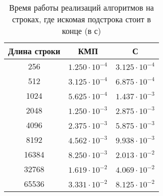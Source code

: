 \begin{table}[H]
	\begin{center}
		\begin{threeparttable}
			\captionsetup{justification=raggedright,singlelinecheck=off}
			\caption{Время работы реализаций алгоритмов на строках, где искомая подстрока стоит в конце (в с)}
			\label{tbl:time_measurements_1}
			\begin{tabular}{|c|c|c|}
				\hline
				Длина строки &  КМП  & С \\
				\hline
				256 &$ 1.250\cdot 10^{-4} $&$ 3.125\cdot 10^{-4}$\\
				\hline
				512 &$ 3.125\cdot 10^{-4} $&$ 6.875\cdot 10^{-4}$\\
				\hline
				1024 &$ 5.625\cdot 10^{-4} $&$ 1.437\cdot 10^{-3}$\\
				\hline
				2048 &$ 1.250\cdot 10^{-3} $&$ 2.875\cdot 10^{-3}$\\
				\hline
				4096 &$ 2.375\cdot 10^{-3} $&$ 5.875\cdot 10^{-3}$\\
				\hline
				8192 &$ 4.562\cdot 10^{-3} $&$ 9.938\cdot 10^{-3}$\\
				\hline
				16384 &$ 8.250\cdot 10^{-3} $&$ 2.013\cdot 10^{-2}$\\
				\hline
				32768 &$ 1.619\cdot 10^{-2} $&$ 4.069\cdot 10^{-2}$\\
				\hline
				65536 &$ 3.331\cdot 10^{-2} $&$ 8.125\cdot 10^{-2}$\\
				\hline
			\end{tabular}
		\end{threeparttable}
	\end{center}
\end{table}

